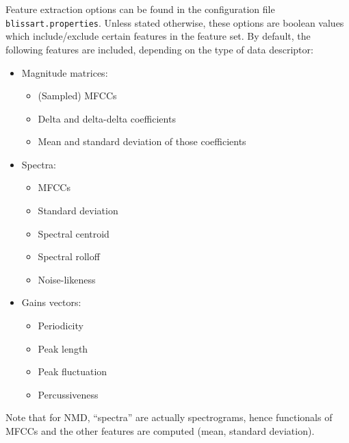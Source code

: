 Feature extraction options can be found in the configuration file {\tt
  blissart.properties}. Unless stated otherwise, these options are boolean
values which include/exclude certain features in the feature set. By default,
the following features are included, depending on the type of data descriptor:
\begin{itemize}
    \item   Magnitude matrices:
        \begin{itemize}
            \item   (Sampled) MFCCs
            \item   Delta and delta-delta coefficients
            \item   Mean and standard deviation of those coefficients
        \end{itemize}
    \item   Spectra:
        \begin{itemize}
            \item   MFCCs
            \item   Standard deviation
            \item   Spectral centroid
            \item   Spectral rolloff
            \item   Noise-likeness
        \end{itemize}
    \item   Gains vectors:
        \begin{itemize}
            \item   Periodicity
            \item   Peak length
            \item   Peak fluctuation
            \item   Percussiveness
        \end{itemize}
\end{itemize}

Note that for NMD, ``spectra'' are actually spectrograms, hence functionals of
MFCCs and the other features are computed (mean, standard deviation).

